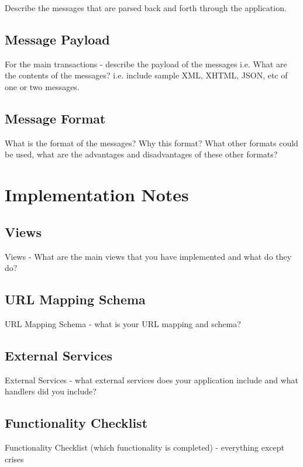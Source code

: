 \documentclass{sig-alt-release2}
\begin{document}
Describe the messages that are parsed back and forth through the application.

\subsection{Message Payload}

For the main transactions - describe the payload of the messages 
i.e. What are the contents of the messages? i.e. include sample XML, XHTML, JSON, etc of one or two messages.

\subsection{Message Format}

What is the format of the messages? 
Why this format? 
What other formats could be used, what are the advantages and disadvantages of these other formats?

\section{Implementation Notes}

\subsection{Views}

Views - What are the main views that you have implemented and what do they do?

\subsection{URL Mapping Schema}

URL Mapping Schema - what is your URL mapping and schema?

\subsection{External Services}

External Services  - what external services does your application include and what handlers did you include?

\subsection{Functionality Checklist}

Functionality Checklist (which functionality is completed) - everything except crises
\end{document}
